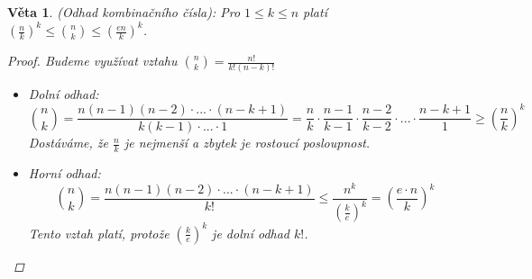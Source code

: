 \documentclass[10pt,a4paper]{article}
\newtheorem{veta}{Věta}
\begin{document}
\begin{veta} (Odhad kombinačního čísla): \normalfont
    Pro $1\leq k \leq n$ platí $\displaystyle \left(\frac nk\right)^k \leq \binom nk \leq \left(\frac{en}{k}\right)^k$.

    \begin{proof}
        Budeme využívat vztahu $\displaystyle \binom nk = \frac{n!}{k!(n-k)!}$
        \begin{itemize}
            \item \textit{Dolní odhad:} 
            $$\binom nk = \frac{n (n-1)(n-2) \cdot ... \cdot (n-k+1)}{k(k-1) \cdot ... \cdot 1} = \frac nk \cdot \frac{n-1}{k-1} \cdot \frac{n-2}{k-2} \cdot ... \cdot \frac{n-k+1}{1} \geq \left(\frac{n}{k}\right)^k$$
            Dostáváme, že $\frac nk$ je nejmenší a zbytek je rostoucí posloupnost.
            \item \textit{Horní odhad:}
            $$\binom nk = \frac{n (n-1)(n-2) \cdot ... \cdot (n-k+1)}{k!} \leq \frac{n^k}{\left(\frac ke\right)^k} = \left(\frac{e\cdot n}{k}\right)^k$$
            Tento vztah platí, protože $\displaystyle \left(\frac ke\right)^k$ je dolní odhad $k!$.
        \end{itemize}
    \end{proof}
\end{veta}
\end{document}
